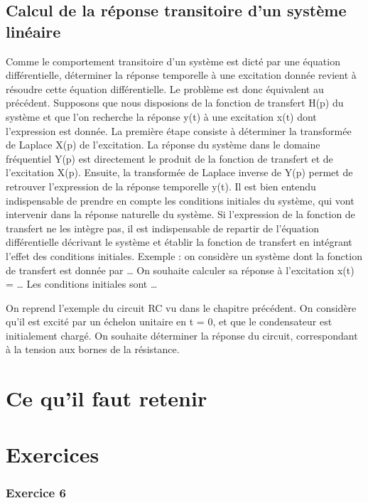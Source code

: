 \documentclass[]{book}
\begin{document}
{	\subsection{Calcul de la réponse transitoire d'un système linéaire}
	Comme le comportement transitoire d'un système est dicté par une équation différentielle, déterminer la réponse temporelle à une excitation donnée revient à résoudre cette équation différentielle. Le problème est donc équivalent au précédent. Supposons que nous disposions de la fonction de transfert H(p) du système et que l'on recherche la réponse y(t) à une excitation x(t) dont l'expression est donnée. La première étape consiste à déterminer la transformée de Laplace X(p) de l'excitation. La réponse du système dans le domaine fréquentiel Y(p) est directement le produit de la fonction de transfert et de l'excitation X(p). Ensuite, la transformée de Laplace inverse de Y(p) permet de retrouver l'expression de la réponse temporelle y(t).
	Il est bien entendu indispensable de prendre en compte les conditions initiales du système, qui vont intervenir dans la réponse naturelle du système. Si l'expression de la fonction de transfert ne les intègre pas, il est indispensable de repartir de l'équation différentielle décrivant le système et établir la fonction de transfert en intégrant l'effet des conditions initiales.
	Exemple : on considère un système dont la fonction de transfert est donnée par … On souhaite calculer sa réponse à l'excitation x(t) = … Les conditions initiales sont …
	
	
	On reprend l'exemple du circuit RC vu dans le chapitre précédent. On considère qu'il est excité par un échelon unitaire en t = 0, et que le condensateur est initialement chargé. On souhaite déterminer la réponse du circuit, correspondant à la tension aux bornes de la résistance.
	
	\section{Ce qu'il faut retenir}
	
	\section{Exercices}
	
	
	
	\subsubsection{Exercice 6}
	
}
\end{document}
